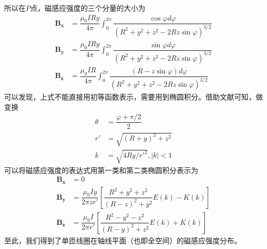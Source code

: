 \documentclass{ctexart}
\begin{document}
\begin{multicols}{2}
\begin{equation}
\end{equation}
所以在$P$点，磁感应强度的三个分量的大小为
\begin{align}
    \bm{B_x}&=\dfrac{\mu_0 IRy}{4\pi}\int_0^{2\pi} \dfrac{\cos \varphi d\varphi }{(R^2+y^2+z^2-2Rz\sin \varphi)^{3/2}} \\
    \bm{B_y}&=\dfrac{\mu_0 IRy}{4\pi}\int_0^{2\pi} \dfrac{\sin \varphi d\varphi }{(R^2+y^2+z^2-2Rz\sin \varphi)^{3/2}}  \\
    \bm{B_z}&=\dfrac{\mu_0 IR}{4\pi}\int_0^{2\pi} \dfrac{(R-z\sin \varphi)d\varphi }{(R^2+y^2+z^2-2Rz\sin \varphi)^{3/2}} 
\end{align}
可以发现，上式不能直接用初等函数表示，需要用到椭圆积分。借助文献\cite{1}可知，做变换
\begin{align}
    \theta&=\dfrac{\varphi +\pi /2}{2}\\
    r'&=\sqrt{(R+y)^2+z^2}\\
    k&=\sqrt{4Ry/r'^2},|k|<1
\end{align}
可以将磁感应强度的表达式用第一类和第二类椭圆积分表示为
\begin{align}
    \bm{B_x}&=0\\
    \bm{B_y}&=\dfrac{\mu_0 Iy}{2\pi zr'}[\dfrac{R^2+y^2+z^2}{(R-z)^2+y^2}E(k)-K(k)]\\
    \bm{B_z}&=\dfrac{\mu_0 I}{2\pi r'}[\dfrac{R^2-y^2-z^2}{(R-y)^2+z^2}E(k)+K(k)]
\end{align}
至此，我们得到了单匝线圈在轴线平面（也即全空间）的磁感应强度分布。

\end{multicols}
\end{document}
